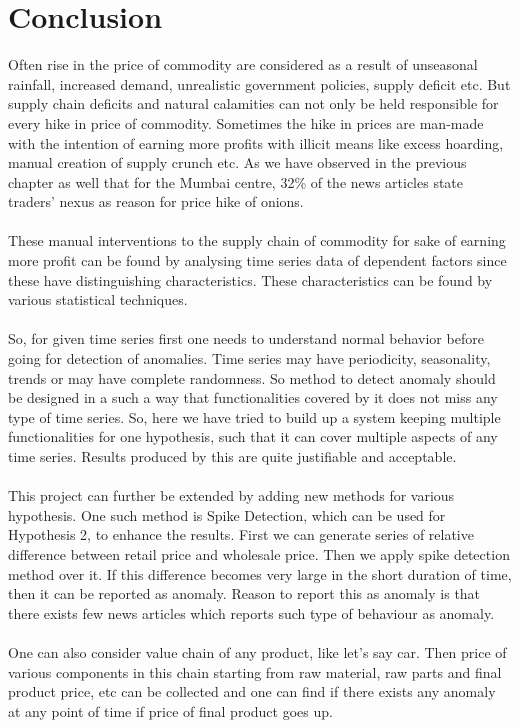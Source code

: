 \chapter{Conclusion}

Often rise in the price of commodity are considered as a result of unseasonal rainfall, increased demand, unrealistic government policies, supply deficit etc. But supply chain deficits and natural calamities can not only be held responsible for every hike in price of commodity. Sometimes the hike in prices are man-made with the intention of earning more profits with illicit means like excess hoarding, manual creation of supply crunch etc. As we have observed in the previous chapter as well that for the Mumbai centre, 32\% of the news articles state traders' nexus as reason for price hike of onions.\\
\\
These manual interventions to the supply chain of commodity for sake of earning more profit can be found by analysing time series data of dependent factors since these have distinguishing characteristics. These characteristics can be found by various statistical techniques.\\
\\
So, for given time series first one needs to understand normal behavior before going for detection of anomalies. Time series may have periodicity, seasonality, trends or may have complete randomness. So method to detect anomaly should be designed in a such a way that functionalities covered by it does not miss any type of time series. So, here we have tried to build up a system keeping multiple functionalities for one hypothesis, such that it can cover multiple aspects of any time series. Results produced by this are quite justifiable and acceptable.\\
\\
This project can further be extended by adding new methods for various hypothesis. One such method is Spike Detection, which can be used for Hypothesis 2, to enhance the results. First we can generate series of relative difference between retail price and wholesale price. Then we apply spike detection method over it. If this difference becomes very large in the short duration of time, then it can be reported as anomaly. Reason to report this as anomaly is that there exists few news articles which reports such type of behaviour as anomaly.\\
\\
One can also consider value chain of any product, like let's say car. Then price of various components in this chain starting from raw material, raw parts and final product price, etc can be collected and one can find if there exists any anomaly at any point of time if price of final product goes up.\\
